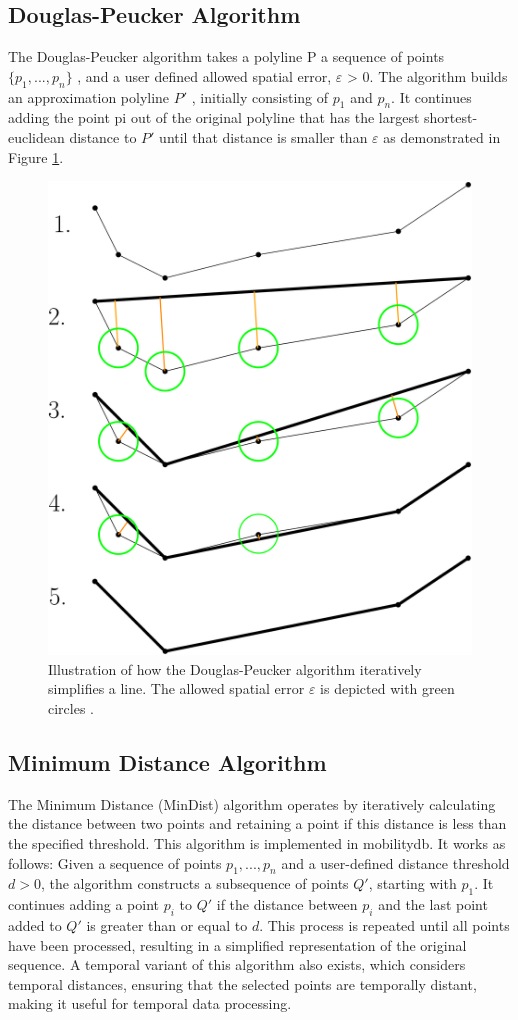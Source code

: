 \subsection{Douglas-Peucker Algorithm}
The Douglas-Peucker algorithm  \cite{douglas1973algorithms} \cite{hershberger1994n} takes a polyline P a sequence of points $\{p_{1},..., p_{n}\}$ , and a user defined allowed spatial error, $\varepsilon$ > 0. The algorithm builds an approximation polyline $P'$ , initially consisting of $p_{1}$ and $p_{n}$. It continues adding the point pi out of the original polyline that has the largest shortest-euclidean distance to $P'$ until that distance is smaller than $\varepsilon$ as demonstrated in Figure \ref{fig:dgpk}.

\begin{figure}[!ht]
    \centering
    \includegraphics[width=0.5\linewidth]{figures/dgpk.png}
    \caption[Illustration of Douglas-Peucker algorithm \cite{van2017extensive}]{Illustration of how the Douglas-Peucker algorithm iteratively simplifies a line. The allowed spatial error  $\varepsilon$  is depicted with green circles \cite{van2017extensive}. }
    \label{fig:dgpk}
\end{figure}

\subsection{Minimum Distance Algorithm}
The Minimum Distance (MinDist) algorithm operates by iteratively calculating the distance between two points and retaining a point if this distance is less than the specified threshold. This algorithm is implemented in mobilitydb. It works as follows: Given a sequence of points ${p_{1},..., p_{n}}$ and a user-defined distance threshold $d > 0$, the algorithm constructs a subsequence of points $Q'$, starting with $p_{1}$. It continues adding a point $p_{i}$ to $Q'$ if the distance between $p_{i}$ and the last point added to $Q'$ is greater than or equal to $d$. This process is repeated until all points have been processed, resulting in a simplified representation of the original sequence. A temporal variant of this algorithm also exists, which considers temporal distances, ensuring that the selected points are temporally distant, making it useful for temporal data processing. 

